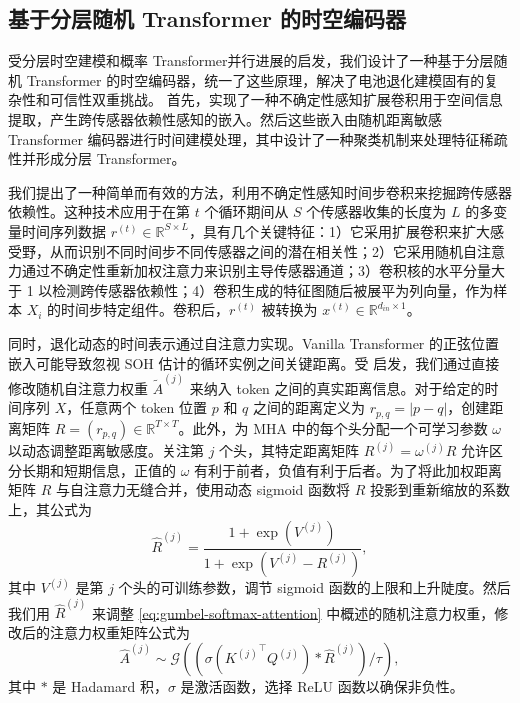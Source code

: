\documentclass[UTF8,journal,twoside,web]{ieeecolor}
\newcommand{\newtext}[1]{{\leavevmode\color{blue}#1}}
\begin{document}
\subsection{基于分层随机 Transformer 的时空编码器}\label{subsec:hierarchical_spatialtemporal}

\newtext{受分层时空建模\cite{qianhstformerhierarchicalspatialtemporaltransformers}和概率 Transformer\cite{9879185}并行进展的启发，我们设计了一种基于分层随机 Transformer 的时空编码器，统一了这些原理，解决了电池退化建模固有的复杂性和可信性双重挑战。}
% 
首先，实现了一种不确定性感知扩展卷积用于空间信息提取，产生跨传感器依赖性感知的嵌入。然后这些嵌入由随机距离敏感 Transformer 编码器进行时间建模处理，其中设计了一种聚类机制来处理特征稀疏性并形成分层 Transformer。

我们提出了一种简单而有效的方法，利用不确定性感知时间步卷积来挖掘跨传感器依赖性。这种技术应用于在第 $t$ 个循环期间从 $S$ 个传感器收集的长度为 $L$ 的多变量时间序列数据 $r^{(t)} \in \mathbb{R}^{S \times L}$，具有几个关键特征：1）它采用扩展卷积来扩大感受野，从而识别不同时间步不同传感器之间的潜在相关性；2）它采用随机自注意力通过不确定性重新加权注意力来识别主导传感器通道；3）卷积核的水平分量大于 1 以检测跨传感器依赖性；4）卷积生成的特征图随后被展平为列向量，作为样本 $X_{i}$ 的时间步特定组件。卷积后，$r^{(t)}$ 被转换为 $x^{(t)} \in \mathbb{R}^{d_{in} \times 1}$。

同时，退化动态的时间表示通过自注意力实现。Vanilla Transformer 的正弦位置嵌入可能导致忽视 SOH 估计的循环实例之间关键距离。受\cite{wu-etal-2021-da} 启发，我们通过直接修改随机自注意力权重 $\tilde{A}^{(j)}$ 来纳入 token 之间的真实距离信息。对于给定的时间序列 $X$，任意两个 token 位置 $p$ 和 $q$ 之间的距离定义为 $r_{p,q} = |p-q|$，创建距离矩阵 $R = (r_{p,q}) \in \mathbb{R}^{T \times T}$。此外，为 MHA 中的每个头分配一个可学习参数 $\omega$ 以动态调整距离敏感度。关注第 $j$ 个头，其特定距离矩阵 $R^{(j)} = \omega^{(j)}R$ 允许区分长期和短期信息，正值的 $\omega$ 有利于前者，负值有利于后者。为了将此加权距离矩阵 $R$ 与自注意力无缝合并，使用动态 sigmoid 函数将 $R$ 投影到重新缩放的系数上，其公式为
\begin{equation}
\hat{R}^{(j)} = \frac{1+\exp(V^{(j)})}{1+\exp(V^{(j)}-R^{(j)})},
\label{eq:distance_matrix_coefficient}
\end{equation}%
其中 $V^{(j)}$ 是第 $j$ 个头的可训练参数，调节 sigmoid 函数的上限和上升陡度。然后我们用 $\hat{R}^{(j)}$ 来调整 \eqref{eq:gumbel-softmax-attention} 中概述的随机注意力权重，修改后的注意力权重矩阵公式为
\begin{equation}
\hat{A}^{(j)} \sim \mathcal{G}((\sigma({K^{(j)}}^\top Q^{(j)}) * \hat{R}^{(j)}) / {\tau}),
\label{eq:distance_sensitive_self_attention}
\end{equation}%
其中 $*$ 是 Hadamard 积，$\sigma$ 是激活函数，选择 ReLU 函数以确保非负性。
\end{document}
